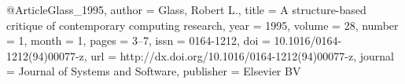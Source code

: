 @Article{Glass_1995,
  author =       {Glass, Robert L.},
  title =        {A structure-based critique of contemporary computing research},
  year =         1995,
  volume =       28,
  number =       1,
  month =        1,
  pages =        {3–7},
  issn =         {0164-1212},
  doi =          {10.1016/0164-1212(94)00077-z},
  url =          {http://dx.doi.org/10.1016/0164-1212(94)00077-z},
  journal =      {Journal of Systems and Software},
  publisher =    {Elsevier BV}
}
